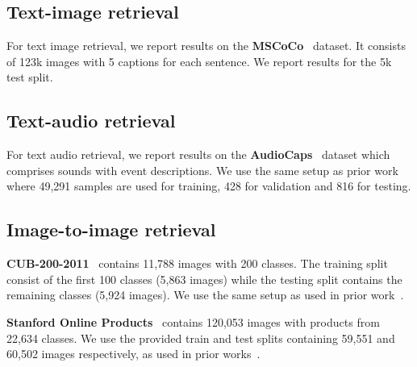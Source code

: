 \subsection{Text-image retrieval}

For text image retrieval, we report results on the \textbf{MSCoCo}~\cite{Chen2015MicrosoftCC} dataset. It consists of 123k images with 5 captions for each sentence. We report results for the 5k test split.

\subsection{Text-audio retrieval}

For text audio retrieval,
we report results on the \textbf{AudioCaps}~\cite{Kim2019AudioCapsGC} dataset
which comprises sounds with event descriptions.
We use the same setup as prior work~\cite{oncescu2021audio}
where 49,291 samples are used for training, 428 for validation and 816 for testing.

\subsection{Image-to-image retrieval}

\indent \textbf{CUB-200-2011}~\cite{Wah2011TheCB} contains
11,788 images with 200 classes.
The training split consist of the first 100 classes
(5,863 images) while the testing split contains the remaining
classes (5,924 images).
We use the same setup as used in prior work~\cite{roth2020revisiting}.

\indent \textbf{Stanford Online Products}~\cite{Song2016DeepML}
contains 120,053 images with products from 22,634 classes.
We use the provided train and test splits containing 59,551
and 60,502 images respectively,
as used in prior works~\cite{Song2016DeepML, roth2020revisiting}.


